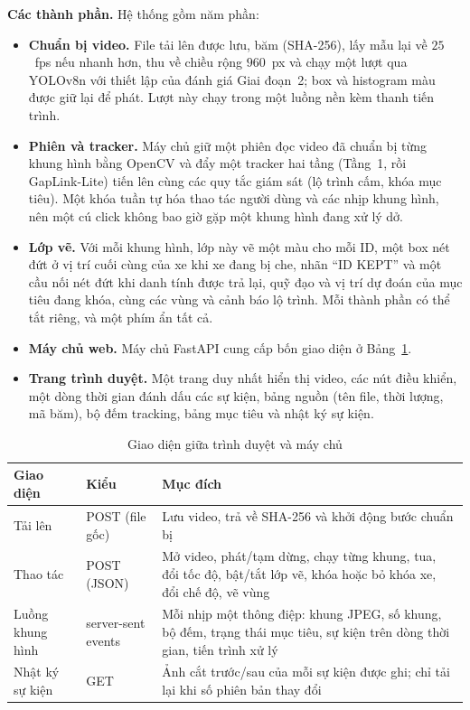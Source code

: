 \textbf{Các thành phần.} Hệ thống gồm năm phần:
\begin{itemize}
    \item \textbf{Chuẩn bị video.} File tải lên được lưu, băm (SHA-256), lấy mẫu lại về $25$~fps nếu nhanh hơn, thu về chiều rộng $960$~px và chạy một lượt qua YOLOv8n với thiết lập của đánh giá Giai đoạn~2; box và histogram màu được giữ lại để phát. Lượt này chạy trong một luồng nền kèm thanh tiến trình.
    \item \textbf{Phiên và tracker.} Máy chủ giữ một phiên đọc video đã chuẩn bị từng khung hình bằng OpenCV và đẩy một tracker hai tầng (Tầng~1, rồi GapLink-Lite) tiến lên cùng các quy tắc giám sát (lộ trình cấm, khóa mục tiêu). Một khóa tuần tự hóa thao tác người dùng và các nhịp khung hình, nên một cú click không bao giờ gặp một khung hình đang xử lý dở.
    \item \textbf{Lớp vẽ.} Với mỗi khung hình, lớp này vẽ một màu cho mỗi ID, một box nét đứt ở vị trí cuối cùng của xe khi xe đang bị che, nhãn ``ID KEPT'' và một cầu nối nét đứt khi danh tính được trả lại, quỹ đạo và vị trí dự đoán của mục tiêu đang khóa, cùng các vùng và cảnh báo lộ trình. Mỗi thành phần có thể tắt riêng, và một phím ẩn tất cả.
    \item \textbf{Máy chủ web.} Máy chủ FastAPI cung cấp bốn giao diện ở Bảng~\ref{tab:api}.
    \item \textbf{Trang trình duyệt.} Một trang duy nhất hiển thị video, các nút điều khiển, một dòng thời gian đánh dấu các sự kiện, bảng nguồn (tên file, thời lượng, mã băm), bộ đếm tracking, bảng mục tiêu và nhật ký sự kiện.
\end{itemize}

\begin{table}[H]
    \centering
    \caption{Giao diện giữa trình duyệt và máy chủ}
    \label{tab:api}
    \small
    \begin{tabularx}{\textwidth}{l l X}
        \toprule
        \textbf{Giao diện} & \textbf{Kiểu} & \textbf{Mục đích} \\
        \midrule
        Tải lên & POST (file gốc) & Lưu video, trả về SHA-256 và khởi động bước chuẩn bị \\
        Thao tác & POST (JSON) & Mở video, phát/tạm dừng, chạy từng khung, tua, đổi tốc độ, bật/tắt lớp vẽ, khóa hoặc bỏ khóa xe, đổi chế độ, vẽ vùng \\
        Luồng khung hình & server-sent events & Mỗi nhịp một thông điệp: khung JPEG, số khung, bộ đếm, trạng thái mục tiêu, sự kiện trên dòng thời gian, tiến trình xử lý \\
        Nhật ký sự kiện & GET & Ảnh cắt trước/sau của mỗi sự kiện được ghi; chỉ tải lại khi số phiên bản thay đổi \\
        \bottomrule
    \end{tabularx}
\end{table}


